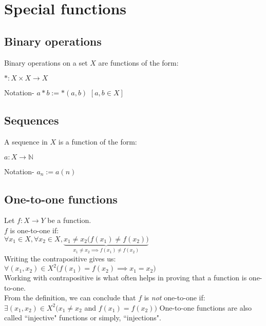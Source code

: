 \section{Special functions}
\subsection{Binary operations}
Binary operations on a set $X$ are functions of the form:
\begin{center}
    $*:X\times X\to X$
\end{center}
Notation- $a*b := *(a, b)$ \hfill $[a, b \in X]$
\subsection{Sequences}
A sequence in $X$ is a function of the form:
\begin{center}
    $a:X\to\mathbb{N}$
\end{center}
Notation- $a_n := a(n)$
\subsection{One-to-one functions}
Let $f:X\to Y$ be a function.\\
$f$ is one-to-one if:\\
$\forall x_1\in X, \forall x_2 \in X, \underbrace{x_1\neq x_2 \big(f(x_1) \neq f(x_2)\big)}_{x_1\neq x_2\implies f(x_1)\neq f(x_2)}$\\
Writing the contrapositive gives us:\\
$\forall (x_1, x_2) \in X^2 \big(f(x_1) = f(x_2) \implies x_1 = x_2\big)$\\
Working with contrapositive is what often helps in proving that a function is one-to-one.\\
From the definition, we can conclude that $f$ is \textit{not} one-to-one if:\\
$\exists (x_1, x_2) \in X^2\big(x_1 \neq x_2$ and $f(x_1) = f(x_2)\big)$
One-to-one functions are also called ``injective" functions or simply, ``injections".
%

